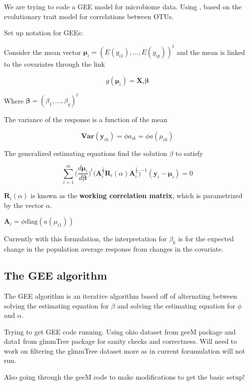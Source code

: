 \documentclass[10pt]{article}
\begin{document}
We are trying to code a GEE model for microbiome data. Using \cite{Xiao2018}, based on the evolutionary trait model for correlations between OTUs.


Set up notation for GEEs:

Consider the mean vector $\boldsymbol\mu_i = (E(y_{i1}), \ldots , E(y_{ip}))^t$ and the mean is linked to the covariates through the link

$$g(\boldsymbol\mu_i ) = \mathbf{X}_i \boldsymbol\beta$$

Where $\boldsymbol\beta = (\beta_1 , \ldots , \beta_q)^t$

The variance of the response is a function of the mean

$$\textbf{Var}(\mathbf{y}_{ik}) = \phi a_{ik} = \phi a(\mu_{ik})$$


The generalized estimating equations find the solution $\beta $ to satisfy

$$\sum_{i = 1}^m \bigg(\frac{d \boldsymbol\mu_i}{d \boldsymbol\beta}\bigg)^t \bigg(\mathbf{A}_i^{\frac{1}{2}} \mathbf{R}_i(\alpha) \mathbf{A}_i^{\frac{1}{2}}\bigg)^{-1}(\mathbf{y}_i - \boldsymbol\mu_i) = 0$$


$\mathbf{R}_i(\alpha)$ is known as the \textbf{working correlation matrix}, which is parametrized by the vector $\alpha$.

$\mathbf{A}_i = \phi\text{diag}(a(\mu_{i1}))$


Currently with this formulation, the interpretation for $\beta_k$ is for the expected change in the population average response from changes in the covariate.


\subsection{The GEE algorithm}

The GEE algorithm is an iterative algorithm based off of  alternating between solving the estimating equation for $\beta$ and solving the estimating equation for $\phi$ and $\alpha$.





Trying to get GEE code running. Using ohio dataset from geeM package and data1 from glmmTree package for sanity checks and correctness. Will need to work on filtering the glmmTree dataset more as in current forumulation will not run.

Also going through the geeM code to make modifications to get the basic setup!










\end{document}
